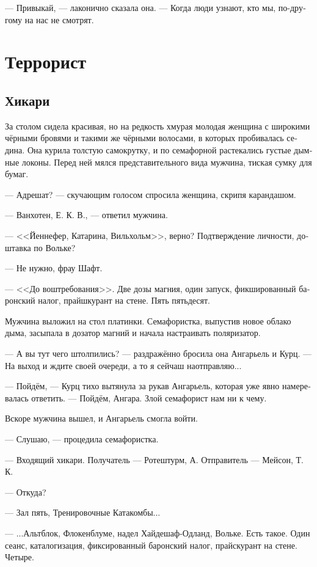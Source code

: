 \documentclass[a4paper,12pt,fleqn]{book}\usepackage{cooltooltips}\usepackage{polyglossia}\setdefaultlanguage[babelshorthands=true]{russian}\setotherlanguage{english}\defaultfontfeatures{Ligatures=TeX,Mapping=tex-text} \usepackage{xcolor}\definecolor{lightgray}{HTML}{bbbbbb}\color{lightgray}\newcommand{\ml}[3]{\textenglish{\textcolor{black}{#3}}}
\begin{document}
--- Привыкай, --- лаконично сказала она.
--- Когда люди узнают, кто мы, по-другому на нас не смотрят.

\chapter{Террорист}

\section{Хикари}

За столом сидела красивая, но на редкость хмурая молодая женщина с широкими чёрными бровями и такими же чёрными волосами, в которых пробивалась седина.
Она курила толстую самокрутку, и по семафорной растекались густые дымные локоны.
Перед ней мялся представительного вида мужчина, тиская сумку для бумаг.

--- Адрешат? --- скучающим голосом спросила женщина, скрипя карандашом.

--- Ванхотен, Е. К. В., --- ответил мужчина.

--- <<Йеннефер, Катарина, Вильхольм>>, верно?
Подтверждение личности, доштавка по Вольке?

--- Не нужно, фрау Шафт.

--- <<До воштребования>>.
Две дозы магния, один запуск, фикшированный баронский налог, прайшкурант на стене.
Пять пятьдесят.

Мужчина выложил на стол платинки.
Семафористка, выпустив новое облако дыма, засыпала в дозатор магний и начала настраивать поляризатор.

--- А вы тут чего штолпились? --- раздражённо бросила она Ангарьель и Курц.
--- На выход и ждите своей очереди, а то я сейчаш наотправляю...

--- Пойдём, --- Курц тихо вытянула за рукав Ангарьель, которая уже явно намеревалась ответить.
--- Пойдём, Ангара.
Злой семафорист нам ни к чему.

Вскоре мужчина вышел, и Ангарьель смогла войти.

--- Слушаю, --- процедила семафористка.

--- Входящий хикари.
Получатель --- Ротештурм, А.
Отправитель --- Мейсон, Т. К.

--- Откуда?

--- Зал пять, Тренировочные Катакомбы...

--- ...Альтблок, Флокенблуме, надел Хайдешаф-Одланд, Вольке.
Есть такое.
Один сеанс, каталогизация, фиксированный баронский налог, прайскурант на стене.
Четыре.
\end{document}
